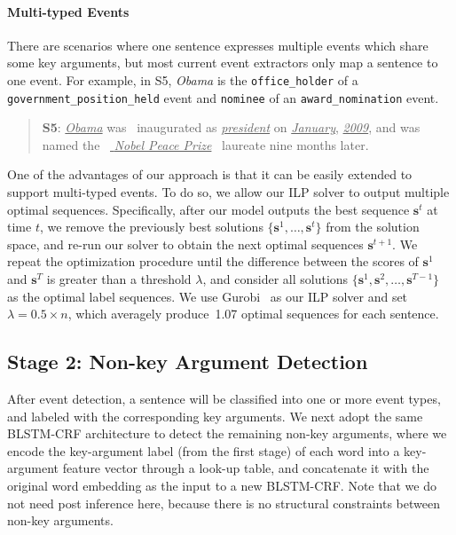 \paragraph{Multi-typed Events}
There are scenarios where one sentence expresses multiple events which share some key arguments,
but most current event extractors only map a sentence to one event.
For example, in S5, \emph{Obama} is the \texttt{office\_holder} of a \texttt{government\_position\_held} event and \texttt{nominee} of an \texttt{award\_nomination} event.
\begin{quote}
	\textbf{S5}: \underline{\emph{Obama}} was  inaugurated as \underline{\emph{president}} on \underline{\emph{January}}, \underline{\emph{2009}}, and was named the  \underline{\emph{ Nobel  Peace  Prize}}  laureate nine months later.
\end{quote}
One of the advantages of our approach is that it can be easily extended to support multi-typed events.
To do so, we allow our ILP solver to output multiple optimal sequences. Specifically, after our model outputs the best sequence $\bm{s}^t$
at time $t$, we remove the previously best solutions
 $\{\bm{s}^1, \ldots, \bm{s}^{t}\}$ from the solution space, and re-run our solver to obtain the next optimal sequences $\bm{s}^{t+1}$.
We repeat the optimization procedure until the difference between the scores of $\bm{s}^1$ and $\bm{s}^T$ is greater
than a threshold $\lambda$, and consider all solutions $\{\bm{s}^1, \bm{s}^2, \ldots, \bm{s}^{T-1}\}$ as the optimal label sequences.
We use Gurobi~\cite{gurobi} as our ILP solver and set $\lambda=0.5 \times n$, which averagely produce~1.07 optimal sequences for each sentence.

\subsection{Stage 2: Non-key Argument Detection}
After event detection, a sentence will be classified into one or more event types, and labeled with the corresponding key arguments.
%
We next adopt the same BLSTM-CRF architecture %
to detect the remaining non-key arguments, where we encode the key-argument label (from the first stage) %
of each word into a key-argument feature vector through a look-up table, and concatenate it with the original word
embedding as the input to a new BLSTM-CRF. Note that we do not need post inference here, because there is no structural constraints between non-key arguments.
